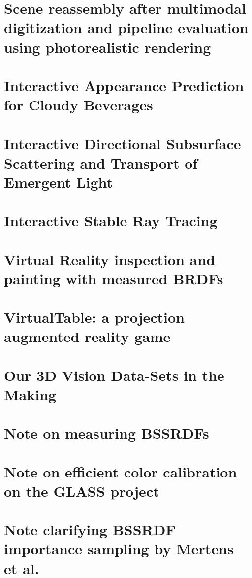 \chapter{Scene reassembly after multimodal digitization and pipeline evaluation using photorealistic rendering}
\label{sec:glass}

%
\chapter{Interactive Appearance Prediction for Cloudy Beverages}
\label{sec:juice}

%
\chapter{Interactive Directional Subsurface Scattering and Transport of Emergent Light}
\label{sec:interactivedirsss}

%
\chapter{Interactive Stable Ray Tracing}
\label{sec:srt}

%
\chapter{Virtual Reality inspection and painting with measured BRDFs}
\label{sec:vrbrdf}

%
\chapter{VirtualTable: a projection augmented reality game}
\label{sec:virtualtable}

%
\chapter{Our 3D Vision Data-Sets in the Making}
\label{sec:robdataset}


\chapter{Note on measuring BSSRDFs}
\label{sec:bssrdfnote}

%
\chapter{Note on efficient color calibration on the GLASS project}
\label{sec:colornote}

%
\chapter{Note clarifying BSSRDF importance sampling by Mertens et al.}
\label{sec:mertensnote}


